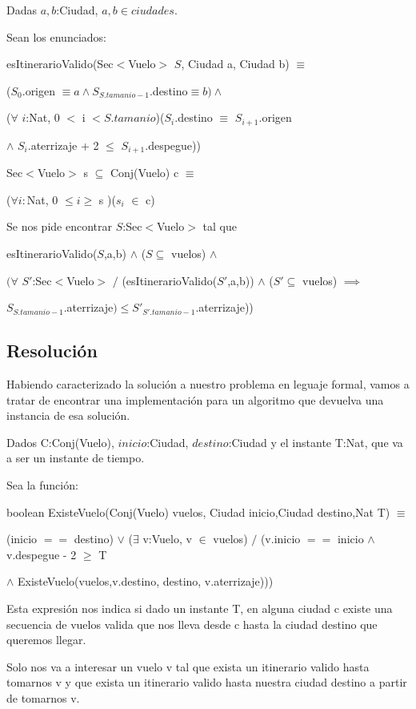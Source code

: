 Dadas $a,b$:Ciudad, $a,b \in ciudades$. 

Sean los enunciados:

esItinerarioValido(Sec$<$Vuelo$>$ $S$, Ciudad a, Ciudad b) $\equiv$
 
($S_{0}$.origen $\equiv a \wedge S_{S.tamanio-1}$.destino$ \equiv b) \wedge$ 

($\forall$ $i$:Nat, 0 $<$ i $<S.tamanio$)($S_{i}$.destino $\equiv$ $S_{i+1}$.origen 

$\wedge$ $S_{i}$.aterrizaje + 2 $\leq$ $S_{i+1}$.despegue))


Sec$<$Vuelo$>$ s $\subseteq$ Conj(Vuelo) c $\equiv$ 

($\forall i:$Nat, 0 $\leq i \geq$ s )($s_{i}$ $\in $ c) 
 

Se nos pide encontrar $S$:Sec$<$Vuelo$>$ tal que 

esItinerarioValido($S$,a,b) $\wedge$ ($S \subseteq$ vuelos) $\wedge$ 

$(\forall$ $S'$:Sec$<$Vuelo$>$ $/$ (esItinerarioValido($S'$,a,b)) $\wedge$ ($S' \subseteq$ vuelos) $\implies$  

$S_{S.tamanio-1}$.aterrizaje$) \leq S'_{S'.tamanio-1}$.aterrizaje))


\newpage
\subsection{Resolución}

Habiendo caracterizado la soluci\'on a nuestro problema en leguaje formal, vamos a tratar de encontrar una implementaci\'on para un algoritmo que devuelva una instancia de esa soluci\'on.

Dados C:Conj(Vuelo), $inicio$:Ciudad, $destino$:Ciudad y el instante T:Nat, que va a ser un instante de tiempo.

Sea la funci\'on:

boolean ExisteVuelo(Conj(Vuelo) vuelos, Ciudad inicio,Ciudad destino,Nat T) $\equiv$

(inicio $==$ destino) $\vee$ ($\exists$ v:Vuelo, v $\in$ vuelos) $/$ (v.inicio $==$ inicio $\wedge$ v.despegue - 2 $\geq$ T 

$\wedge$ ExisteVuelo(vuelos,v.destino, destino, v.aterrizaje))) 

Esta expresi\'on nos indica si dado un instante T, en alguna ciudad c existe una secuencia de vuelos valida que nos lleva desde c hasta la ciudad destino que queremos llegar.

Solo nos va a interesar un vuelo v tal que exista un itinerario valido hasta tomarnos v y que exista un itinerario valido hasta nuestra ciudad destino a partir de tomarnos v.

